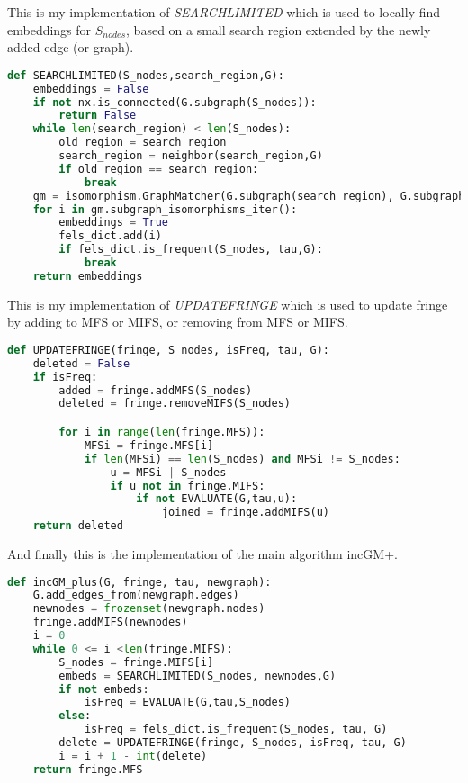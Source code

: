 \documentclass[a4paper, 12pt]{report}
\newcounter{i}
\begin{document}
This is my implementation of \emph{SEARCHLIMITED} which is used to locally find embeddings for $S_{nodes}$, based on a small search region extended by the newly added edge (or graph).
\begin{lstlisting}[language=python, frame=single]
def SEARCHLIMITED(S_nodes,search_region,G):
    embeddings = False
    if not nx.is_connected(G.subgraph(S_nodes)):
        return False
    while len(search_region) < len(S_nodes):
        old_region = search_region
        search_region = neighbor(search_region,G)
        if old_region == search_region:
            break
    gm = isomorphism.GraphMatcher(G.subgraph(search_region), G.subgraph(S_nodes))
    for i in gm.subgraph_isomorphisms_iter():
        embeddings = True
        fels_dict.add(i)
        if fels_dict.is_frequent(S_nodes, tau,G):
            break
    return embeddings
\end{lstlisting}

This is my implementation of \emph{UPDATEFRINGE} which is used to update fringe by adding to MFS or MIFS, or removing from MFS or MIFS.
\begin{lstlisting}[language=python, frame=single]
def UPDATEFRINGE(fringe, S_nodes, isFreq, tau, G):
    deleted = False
    if isFreq:
        added = fringe.addMFS(S_nodes)
        deleted = fringe.removeMIFS(S_nodes)

        for i in range(len(fringe.MFS)):
            MFSi = fringe.MFS[i]
            if len(MFSi) == len(S_nodes) and MFSi != S_nodes:
                u = MFSi | S_nodes
                if u not in fringe.MIFS:
                    if not EVALUATE(G,tau,u):
                        joined = fringe.addMIFS(u)
    return deleted
\end{lstlisting}

And finally this is the implementation of the main algorithm incGM+.
\begin{lstlisting}[language=python, frame=single]
def incGM_plus(G, fringe, tau, newgraph):
    G.add_edges_from(newgraph.edges)
    newnodes = frozenset(newgraph.nodes)
    fringe.addMIFS(newnodes)
    i = 0
    while 0 <= i <len(fringe.MIFS):
        S_nodes = fringe.MIFS[i]
        embeds = SEARCHLIMITED(S_nodes, newnodes,G)
        if not embeds:
            isFreq = EVALUATE(G,tau,S_nodes)
        else:
            isFreq = fels_dict.is_frequent(S_nodes, tau, G)
        delete = UPDATEFRINGE(fringe, S_nodes, isFreq, tau, G)
        i = i + 1 - int(delete)
    return fringe.MFS
\end{lstlisting}
\end{document}

